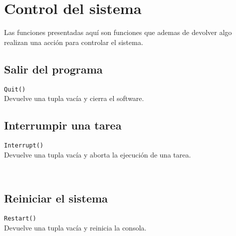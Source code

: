 
\titlespacing{\subsection}{0pt}{10pt}{0pt}

\chapter{Control del sistema}
   Las funciones presentadas aquí son funciones que ademas de devolver algo realizan una acción para controlar el sistema.
   
   \section{Salir del programa}
      \texttt{Quit()}
      \\
      
      Devuelve una tupla vacía y cierra el software.
      
      \begin{fxcode}
      \end{fxcode}
      
   \section{Interrumpir una tarea}
      \texttt{Interrupt()}
      \\
   
      Devuelve una tupla vacía y aborta la ejecución de una tarea.
   
      \begin{fxcode}
         \\
      \end{fxcode}
   
   \section{Reiniciar el sistema}
      \texttt{Restart()}
      \\
      
      Devuelve una tupla vacía y reinicia la consola.
      
      \begin{fxcode}
         \\
      \end{fxcode}
      
